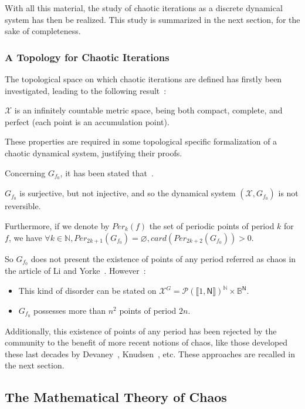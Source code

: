 With all this material, the study of chaotic iterations as a discrete
dynamical system has then be realized. 
This study is summarized in the next section, for the sake of completeness.

\subsubsection{A Topology for Chaotic Iterations}


The topological space on which chaotic iterations are defined has
firstly been investigated, leading to the following result~\cite{gb11:bc,GuyeuxThese10}:
\begin{proposition}
$\mathcal{X}$ is an infinitely countable metric space, being both
compact, complete, and perfect (each point is an accumulation point).
\end{proposition}
These properties are required in some topological specific 
formalization of a chaotic dynamical system, justifying their
proofs.

Concerning $G_{f_0}$, it has been stated that~\cite{GuyeuxThese10}.
\begin{proposition}
$G_{f_0}$ is surjective, but not injective, and so the dynamical system $(\mathcal{X},G_{f_0})$ is not reversible.

Furthermore, if we denote by $Per_k(f)$ the set of periodic points 
of period $k$ for $f$, we have 
 $\forall k \in \mathds{N}, Per_{2k+1}(G_{f_0}) = \varnothing, card\left(Per_{2k+2}(G_{f_0})\right)>0$.
\end{proposition}
 
So $ G_{f_0}$ does not present the existence of points of any period referred as chaos in the article of Li and Yorke~\cite{liyorke1975}.
However~\cite{GuyeuxThese10}:
     \begin{itemize}
       \item This kind of disorder can be stated on $\mathcal{X}^G = \mathcal{P}\left(\llbracket 1,\mathsf{N}\rrbracket\right)^\mathds{N}\times \mathds{B}^\mathsf{N}$.
       \item $G_{f_0}$ possesses more than $n^2$ points of period $2n$.
     \end{itemize}
Additionally, this existence of points of any period has been rejected
by the community to the benefit of more recent notions of chaos, 
like those developed these last decades by Devaney~\cite{Dev89}, Knudsen~\cite{Knudsen94}, etc.
These approaches are recalled in the next section.


\subsection{The Mathematical Theory of Chaos}


